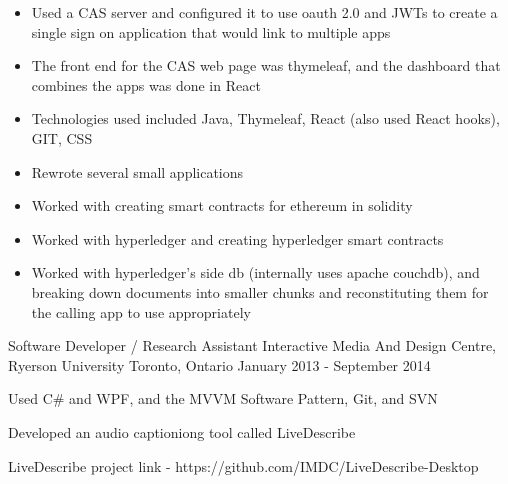 \begin{cventries}
{\begin{cvitems}
{\begin{itemize}
                    \item {Used a CAS server and configured it to use oauth 2.0 and JWTs to create a single sign on application that would link to multiple apps}
                    \item {The front end for the CAS web page was thymeleaf, and the dashboard that combines the apps was done in React}
                \end{itemize}
            }
            \item[] {
                \begin{itemize}
                    \item {Technologies used included Java, Thymeleaf, React (also used React hooks), GIT, CSS}
                    \item {Rewrote several small applications}
                \end{itemize}
            }
            \item[] {
                \begin{itemize}
                    \item {Worked with creating smart contracts for ethereum in solidity}
                    \item {Worked with hyperledger and creating hyperledger smart contracts}
                    \item {Worked with hyperledger's side db (internally uses apache couchdb),
                        and breaking down documents into smaller chunks and reconstituting them for the calling app to use appropriately}
                \end{itemize}
            }
        \end{cvitems}
    }

    \cventry
    {Software Developer / Research Assistant}
    {Interactive Media And Design Centre, Ryerson University}
    {Toronto, Ontario}
    {January 2013 - September 2014}
    {
        \begin{cvitems}
            \item {Used C\# and WPF, and the MVVM Software Pattern, Git, and SVN}
            \item {Developed an audio captioniong tool called LiveDescribe}
            \item {LiveDescribe project link - https://github.com/IMDC/LiveDescribe-Desktop}
        \end{cvitems}
    }
\end{cventries}